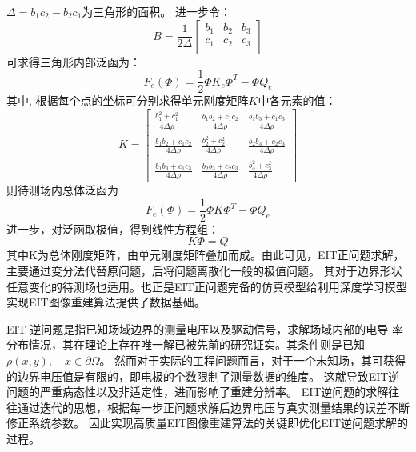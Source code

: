 $\Delta = b_1c_2 - b_2c_1$为三角形的面积。
进一步令：
\begin{equation}
  B = \frac{1}{2\Delta} \left[
  \begin{array}{ccc}
    b_1 & b_2 & b_3 \\
    c_1 & c_2 & c_3 \\
    
  \end{array}
  \right]
\end{equation}
可求得三角形内部泛函为：
\begin{equation}
  F_e(\Phi) = \frac{1}{2} \Phi K_e \Phi^T - \Phi Q_e
\end{equation}
其中,
根据每个点的坐标可分别求得单元刚度矩阵$K$中各元素的值：
\begin{equation}
  K = 
  \left[
  \begin{array}{ccc}
    \frac{b_1^2 + c_1^2}{4\Delta \rho} & \frac{b_1b_2 + c_1c_2}{4\Delta \rho} & \frac{b_1b_3 + c_1c_3}{4\Delta \rho}  \\
    \frac{b_1b_2 + c_1c_2}{4\Delta \rho} & \frac{b_2^2 + c_2^2}{4\Delta \rho} & \frac{b_2b_3 + c_2c_3}{4\Delta \rho} \\
    \frac{b_1b_3 + c_1c_3}{4\Delta \rho} &  \frac{b_2b_3 + c_2c_3}{4\Delta \rho}& \frac{b_3^2 + c_3^2}{4\Delta \rho} 
  \end{array}
  \right]
\end{equation}
则待测场内总体泛函为
\boldmath
\begin{equation}
  F_e(\Phi) = \frac{1}{2} \Phi K \Phi^T - \Phi Q_e
\end{equation}
\unboldmath
进一步，对泛函取极值，得到线性方程组：
\boldmath
\begin{equation}
  K\Phi = Q
\end{equation}
\unboldmath
其中K为总体刚度矩阵，由单元刚度矩阵叠加而成\cite{2019d_cc}。由此可见，EIT正问题求解，主要通过变分法代替原问题，后将问题离散化一般的极值问题。
其对于边界形状任意变化的待测场也适用。也正是EIT正问题完备的仿真模型给利用深度学习模型实现EIT图像重建算法提供了数据基础。

EIT 逆问题是指已知场域边界的测量电压以及驱动信号，求解场域内部的电导
率分布情况，其在理论上存在唯一解已被先前的研究证实\cite{Sun1993An}。其条件则是已知$\rho(x,y),\quad x \in \partial \Omega$。
然而对于实际的工程问题而言，对于一个未知场，其可获得的边界电压值是有限的，即电极的个数限制了测量数据的维度。
这就导致EIT逆问题的严重病态性以及非适定性，进而影响了重建分辨率。
EIT逆问题的求解往往通过迭代的思想，根据每一步正问题求解后边界电压与真实测量结果的误差不断修正系统参数。
因此实现高质量EIT图像重建算法的关键即优化EIT逆问题求解的过程。

